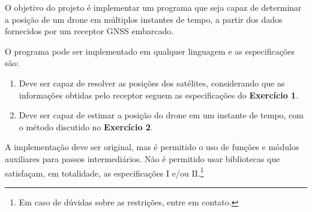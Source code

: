 \documentclass[9pt]{article}
\begin{document}
\vspace{0.3cm}


\noindent
\begin{tcolorbox}[colframe=black,width =7cm,colback=gray!20,arc=0pt]
\end{tcolorbox}

O objetivo do projeto é implementar um programa que seja capaz de determinar a posição de um drone em múltiplos instantes de tempo, a partir dos dados fornecidos por um receptor GNSS embarcado.

O programa pode ser implementado em qualquer linguagem e as especificações são:
\begin{enumerate}[label=\Roman*)]
    \item Deve ser capaz de resolver as posições dos satélites, considerando que as informações obtidas pelo receptor seguem as especificações do \textbf{Exercício 1}.
    \item Deve ser capaz de estimar a posição do drone em um instante de tempo, com o método discutido no \textbf{Exercício 2}.
\end{enumerate}

A implementação deve ser original, mas é permitido o uso de funções e módulos auxiliares para passos intermediários. Não é permitido usar bibliotecas que satisfaçam, em totalidade, as especificações I e/ou II.\footnote{Em caso de dúvidas sobre as restrições, entre em contato.}

\vspace{0.3cm}


\end{document}
